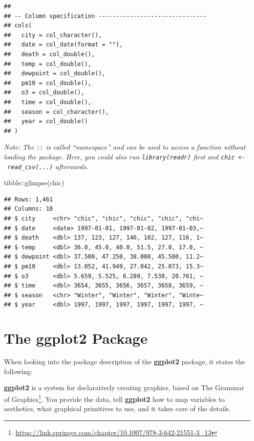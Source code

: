 \documentclass[
]{krantz}
\makeatletter
\newenvironment{Shaded}{\begin{snugshade}}{\end{snugshade}}
\newcommand{\FunctionTok}[1]{\textcolor[rgb]{0,0,0}{#1}}
\newcommand{\NormalTok}[1]{#1}
\newcommand{\SpecialCharTok}[1]{\textcolor[rgb]{0,0,0}{#1}}
\renewenvironment{quote}{\begin{VF}}{\end{VF}}
\renewcommand{\href}[2]{#2\footnote{\url{#1}}}
\newenvironment{kframe}{%
\medskip{}
\setlength{\fboxsep}{.8em}
 \def\at@end@of@kframe{}%
 \ifinner\ifhmode%
  \def\at@end@of@kframe{\end{minipage}}%
  \begin{minipage}{\columnwidth}%
 \fi\fi%
 \def\FrameCommand##1{\hskip\@totalleftmargin \hskip-\fboxsep
 \colorbox{shadecolor}{##1}\hskip-\fboxsep
     \hskip-\linewidth \hskip-\@totalleftmargin \hskip\columnwidth}%
 \MakeFramed {\advance\hsize-\width
   \@totalleftmargin\z@ \linewidth\hsize
   \@setminipage}}%
 {\par\unskip\endMakeFramed%
 \at@end@of@kframe}
\renewenvironment{Shaded}{\begin{kframe}}{\end{kframe}}
\makeatother
\begin{document}
\begin{verbatim}
## 
## -- Column specification -------------------------------
## cols(
##   city = col_character(),
##   date = col_date(format = ""),
##   death = col_double(),
##   temp = col_double(),
##   dewpoint = col_double(),
##   pm10 = col_double(),
##   o3 = col_double(),
##   time = col_double(),
##   season = col_character(),
##   year = col_double()
## )
\end{verbatim}

\emph{Note: The \texttt{::} is called ``namespace'' and can be used to access a function without loading the package. Here, you could also run \texttt{library(readr)} first and \texttt{chic\ \textless{}-\ read\_csv(...)} afterwards.}

\begin{Shaded}
\begin{Highlighting}[]
\NormalTok{tibble}\SpecialCharTok{::}\FunctionTok{glimpse}\NormalTok{(chic)}
\end{Highlighting}
\end{Shaded}

\begin{verbatim}
## Rows: 1,461
## Columns: 10
## $ city     <chr> "chic", "chic", "chic", "chic", "chi~
## $ date     <date> 1997-01-01, 1997-01-02, 1997-01-03,~
## $ death    <dbl> 137, 123, 127, 146, 102, 127, 116, 1~
## $ temp     <dbl> 36.0, 45.0, 40.0, 51.5, 27.0, 17.0, ~
## $ dewpoint <dbl> 37.500, 47.250, 38.000, 45.500, 11.2~
## $ pm10     <dbl> 13.052, 41.949, 27.042, 25.073, 15.3~
## $ o3       <dbl> 5.659, 5.525, 6.289, 7.538, 20.761, ~
## $ time     <dbl> 3654, 3655, 3656, 3657, 3658, 3659, ~
## $ season   <chr> "Winter", "Winter", "Winter", "Winte~
## $ year     <dbl> 1997, 1997, 1997, 1997, 1997, 1997, ~
\end{verbatim}

\hypertarget{ggplot}{%
\section{\texorpdfstring{The \textbf{ggplot2} Package}{The ggplot2 Package}}\label{ggplot}}

When looking into the package description of the \textbf{ggplot2} package, it states the following:

\begin{quote}
\textbf{ggplot2} is a system for declaratively creating graphics, based on \href{https://link.springer.com/chapter/10.1007/978-3-642-21551-3_13}{The Grammar of Graphics}. You provide the data, tell \textbf{ggplot2} how to map variables to aesthetics, what graphical primitives to use, and it takes care of the details.
\end{quote}
\end{document}
